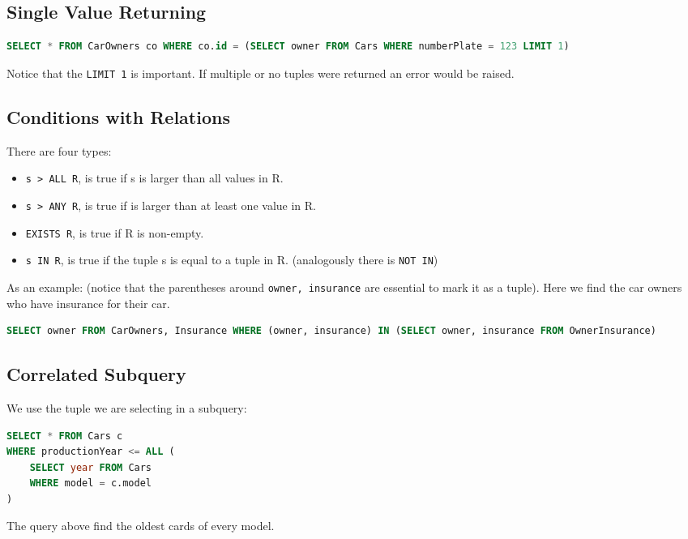 \documentclass{sciposter}
\renewcommand{\t}[1]{\texttt{#1}}
\begin{document}
\begin{multicols}{3}
\subsection*{Single Value Returning}
\begin{lstlisting}[language=SQL]
SELECT * FROM CarOwners co WHERE co.id = (SELECT owner FROM Cars WHERE numberPlate = 123 LIMIT 1)
\end{lstlisting}
Notice that the \t{LIMIT 1} is important. If multiple or no tuples were returned an error would be raised.

\subsection*{Conditions with Relations}

There are four types:

\begin{itemize}
	\item \t{s > ALL R}, is true if s is larger than all values in R.
	\item \t{s > ANY R}, is true if is larger than at least one value in R.
	\item \t{EXISTS R}, is true if R is non-empty.
	\item \t{s IN R}, is true if the tuple s is equal to a tuple in R. (analogously there is \t{NOT IN})
\end{itemize}

As an example: (notice that the parentheses around \t{owner, insurance} are essential to mark it as a tuple). Here we find the car owners who have insurance for their car.
\begin{lstlisting}[language=SQL]
SELECT owner FROM CarOwners, Insurance WHERE (owner, insurance) IN (SELECT owner, insurance FROM OwnerInsurance)
\end{lstlisting}

\subsection*{Correlated Subquery}

We use the tuple we are selecting in a subquery:

\begin{lstlisting}[language=SQL]
SELECT * FROM Cars c
WHERE productionYear <= ALL (
	SELECT year FROM Cars 
	WHERE model = c.model
) 
\end{lstlisting}

The query above find the oldest cards of every model.



\end{multicols}
\end{document}
